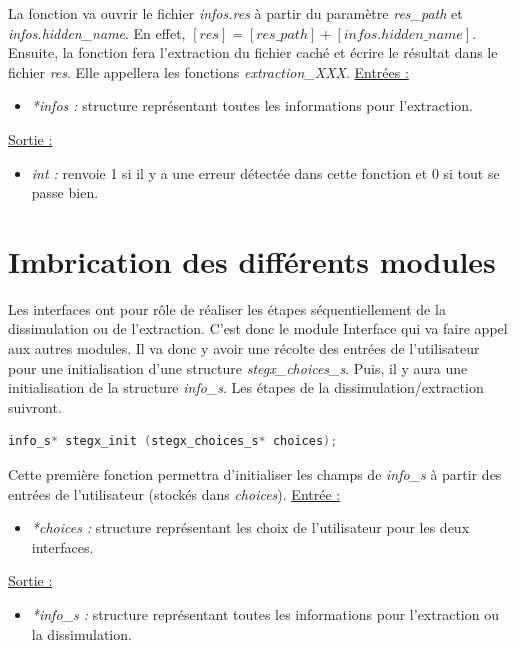 \documentclass[11pt]{article}
\begin{document}
La fonction va ouvrir le fichier \textit{infos.res} à partir du paramètre
\textit{res\_path} et \textit{infos.hidden\_name}. 
En effet, $[res] = [res\_path] + [infos.hidden\_name]$.
Ensuite, la fonction fera l'extraction du fichier caché et écrire le résultat 
dans le fichier \textit{res}. 
Elle appellera les fonctions \textit{extraction\_XXX}. 
\newline
\underline{Entrées :} 
\begin{itemize}
\item \textit{*infos :} structure représentant toutes les informations pour 
l'extraction.  
\end{itemize}
\underline{Sortie :} 
\begin{itemize}
\item \textit{int :} renvoie 1 si il y a une erreur détectée dans cette 
fonction et 0 si tout se passe bien.  
\newline 
\end{itemize}

\section{Imbrication des différents modules}

Les interfaces ont pour rôle de réaliser les étapes séquentiellement 
de la dissimulation ou de l'extraction. C'est donc le module Interface qui 
va faire appel aux autres modules. 
Il va donc y avoir une récolte des entrées de l'utilisateur pour une 
initialisation d'une structure \textit{stegx\_choices\_s}. 
Puis, il y aura une initialisation de la structure \textit{info\_s}. 
Les étapes de la dissimulation/extraction suivront. \newline

\begin{lstlisting}[language=c]
info_s* stegx_init (stegx_choices_s* choices);
\end{lstlisting}

Cette première fonction permettra d'initialiser les champs de \textit{info\_s} 
à partir des entrées de l'utilisateur (stockés dans \textit{choices}). 
\newline
\underline{Entrée :} 
\begin{itemize}
\item \textit{*choices :} structure représentant les choix de 
l'utilisateur pour les deux interfaces. 
\end{itemize}
\underline{Sortie :} 
\begin{itemize}
\item \textit{*info\_s :} structure représentant toutes les informations 
pour l'extraction ou la dissimulation.   
\newline 
\end{itemize}
\end{document}
